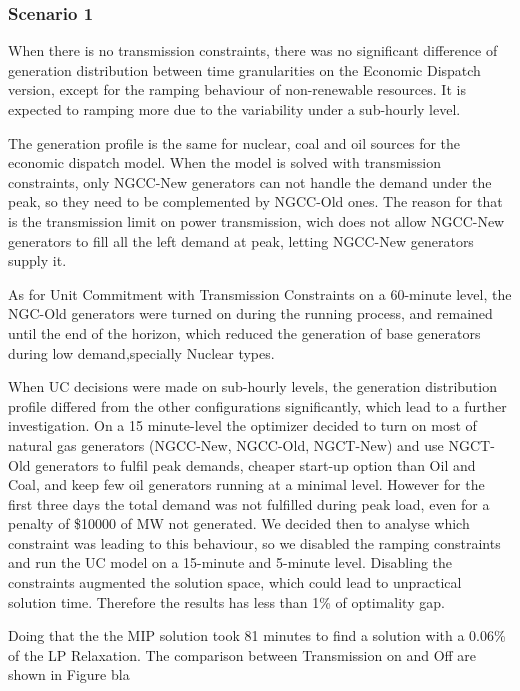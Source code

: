 \documentclass[12pt,LUDisStyle,twosided]{book}
\begin{document}
\subsubsection{Scenario 1}

When there is no transmission constraints, there was no significant difference of generation distribution between time granularities on the Economic Dispatch version, except for the ramping behaviour of non-renewable resources. It is expected to ramping more due to the variability under a sub-hourly level. 

The generation profile is the same for nuclear, coal and oil sources for the economic dispatch model. When the model is solved with transmission constraints, only NGCC-New generators can not handle the demand under the peak, so they need to be complemented by NGCC-Old ones. The reason for that is the transmission limit on power transmission, wich does not allow NGCC-New generators to fill all the left demand at peak, letting NGCC-New generators supply it.

As for Unit Commitment with Transmission Constraints on a 60-minute level, the NGC-Old generators were turned on during the running process, and remained until the end of the horizon, which reduced the generation of base generators during low demand,specially Nuclear types.

When UC decisions were made on sub-hourly levels, the generation distribution profile differed from the other configurations significantly, which lead to a further investigation. On a 15 minute-level the optimizer decided to turn on most of natural gas generators (NGCC-New, NGCC-Old, NGCT-New) and use NGCT-Old generators to fulfil peak demands, cheaper start-up option than Oil and Coal, and keep few oil generators running at a minimal level. However for the first three days the total demand was not fulfilled during peak load, even for a penalty of \$10000 of MW not generated. We decided then to analyse which constraint was leading to this behaviour, so we disabled the ramping constraints and run the UC model on a 15-minute and 5-minute level. Disabling the constraints augmented the solution space, which could lead to unpractical solution time. Therefore the results has less than 1\% of optimality gap.

Doing that the the MIP solution took 81 minutes to find a solution with a 0.06\% of the LP Relaxation. The comparison between Transmission on and Off are shown in Figure bla
\end{document}
